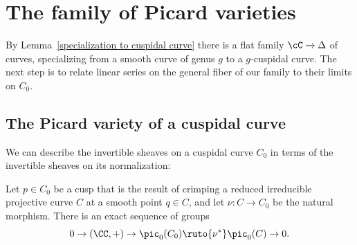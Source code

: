 \section{The family of Picard varieties}\label{Picard family}

By Lemma~\ref{specialization to cuspidal curve} there is a flat family
$\cC \to \Delta$ of curves, specializing from a smooth curve of genus
$g$ to a $g$-cuspidal curve. The next step is to relate linear series
on the general fiber of our family to their limits on $C_0$.

\subsection*{The Picard variety of a cuspidal curve}

\!We can describe the invertible sheaves on a cuspidal curve $C_{0}$
%
%
in terms of the invertible sheaves on its
normalization:

\begin{proposition}\label{torsion free on cuspidal}
Let $p\in C_{0}$ be a cusp that is the result of crimping a reduced
irreducible projective curve $C$ at a smooth point $q\in C$,
and let $\nu: C\to C_{0}$ be the natural morphism.
There is an exact sequence of groups
$$
0 \to (\CC,+) \to \pic_0(C_{0}) \ruto {\nu^*} \pic_0(C) \to 0.
$$
\end{proposition}

